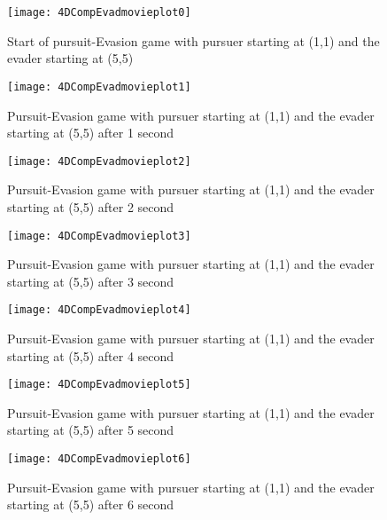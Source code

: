 \begin{figure}
\vspace{2.4in}
\centering
\texttt{[image: 4DCompEvadmovieplot0]}
\caption{Start of pursuit-Evasion game with pursuer starting at (1,1) and the evader starting at (5,5)}
\label{4DCompEvadmovieplot0}
\end{figure}
\clearpage
\newpage

\begin{figure}
\vspace{2.4in}
\centering
\texttt{[image: 4DCompEvadmovieplot1]}
\caption{Pursuit-Evasion game with pursuer starting at (1,1) and the evader starting at (5,5) after 1 second}
\label{4DCompEvadmovieplot1}
\end{figure}
\clearpage
\newpage

\begin{figure}
\vspace{2.4in}
\centering
\texttt{[image: 4DCompEvadmovieplot2]}
\caption{Pursuit-Evasion game with pursuer starting at (1,1) and the evader starting at (5,5) after 2 second}
\label{4DCompEvadmovieplot2}
\end{figure}
\clearpage
\newpage

\begin{figure}
\vspace{2.4in}
\centering
\texttt{[image: 4DCompEvadmovieplot3]}
\caption{Pursuit-Evasion game with pursuer starting at (1,1) and the evader starting at (5,5) after 3 second}
\label{4DCompEvadmovieplot3}
\end{figure}
\clearpage
\newpage

\begin{figure}
\vspace{2.4in}
\centering
\texttt{[image: 4DCompEvadmovieplot4]}
\caption{Pursuit-Evasion game with pursuer starting at (1,1) and the evader starting at (5,5) after 4 second}
\label{4DCompEvadmovieplot4}
\end{figure}
\clearpage
\newpage

\begin{figure}
\vspace{2.4in}
\centering
\texttt{[image: 4DCompEvadmovieplot5]}
\caption{Pursuit-Evasion game with pursuer starting at (1,1) and the evader starting at (5,5) after 5 second}
\label{4DCompEvadmovieplot5}
\end{figure}
\clearpage
\newpage

\begin{figure}
\vspace{2.4in}
\centering
\texttt{[image: 4DCompEvadmovieplot6]}
\caption{Pursuit-Evasion game with pursuer starting at (1,1) and the evader starting at (5,5) after 6 second}
\label{4DCompEvadmovieplot6}
\end{figure}
\clearpage
\newpage

